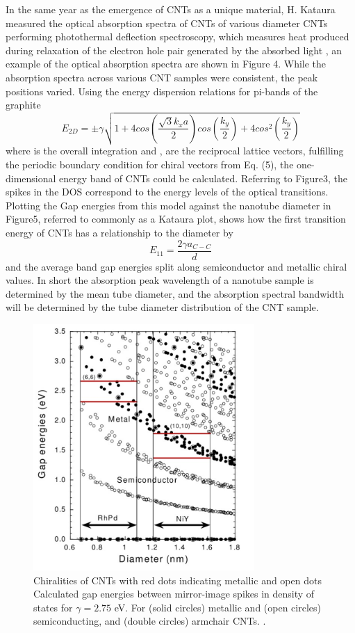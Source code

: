 In the same year as the emergence of CNTs as a unique material, H. Kataura measured the optical absorption spectra of CNTs of various diameter CNTs performing photothermal deflection spectroscopy, which measures heat produced during relaxation of the electron hole pair generated by the absorbed light \cite{kataura}, an example of the optical absorption spectra  are shown in Figure 4. While the absorption spectra across various CNT samples were consistent, the peak positions varied. Using the energy dispersion relations for pi-bands of the graphite \cite{kataura}
\begin{equation}
	E_{2D} = \pm\gamma\sqrt{1+4cos(\frac{\sqrt{3}k_x a}{2})cos(\frac{k_y}{2}) + 4cos^2(\frac{k_y}{2}) }
\end{equation}
where  is the overall integration and ,  are the reciprocal lattice vectors, fulfilling the periodic boundary condition for chiral vectors from Eq. (5), the one-dimensional energy band of CNTs could be calculated. Referring to Figure3, the spikes in the DOS correspond to the energy levels of the optical transitions. Plotting the Gap energies from this model against the nanotube diameter in Figure5, referred to commonly as a Kataura plot, shows how the first transition energy of CNTs has a relationship to the diameter by
\begin{equation}
	E_{11} = \frac{2\gamma a_{C-C}}{d}
\end{equation}
and the average band gap energies split along semiconductor and metallic chiral values. In short the absorption peak wavelength of a nanotube sample is determined by the mean tube diameter, and the absorption spectral bandwidth will be determined by the tube diameter distribution of the CNT sample.
\begin{figure}[h]
	\centering
	\includegraphics[width=0.75\textwidth]{./Figures/CNTs/kautura.png}
	\caption{Chiralities of CNTs with red dots indicating metallic and open dots  Calculated gap energies between mirror-image spikes in density of states for $\gamma = 2.75$ eV. For (solid circles) metallic  and (open circles) semiconducting, and (double circles) armchair CNTs. \cite{kataura}. }
	\label{fig:kataura}
\end{figure}
\clearpage

